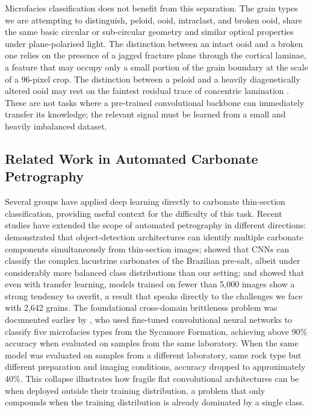 \documentclass[a4paper,fleqn]{cas-dc}
\begin{document}
Microfacies classification does not benefit from this separation. The grain types we are attempting to distinguish, peloid, ooid, intraclast, and broken ooid, share the same basic circular or sub-circular geometry and similar optical properties under plane-polarised light. The distinction between an intact ooid and a broken one relies on the presence of a jagged fracture plane through the cortical laminae, a feature that may occupy only a small portion of the grain boundary at the scale of a 96-pixel crop. The distinction between a peloid and a heavily diagenetically altered ooid may rest on the faintest residual trace of concentric lamination \citep{flugel2010}. These are not tasks where a pre-trained convolutional backbone can immediately transfer its knowledge; the relevant signal must be learned from a small and heavily imbalanced dataset.

\subsection{Related Work in Automated Carbonate Petrography}
\label{sec:lit_taxonnet}
Several groups have applied deep learning directly to carbonate thin-section classification, providing useful context for the difficulty of this task. Recent studies have extended the scope of automated petrography in different directions: \citet{dong2025carbonate} demonstrated that object-detection architectures can identify multiple carbonate components simultaneously from thin-section images; \citet{basso2025presalt} showed that CNNs can classify the complex lacustrine carbonates of the Brazilian pre-salt, albeit under considerably more balanced class distributions than our setting; and \citet{dawson2023dataset} showed that even with transfer learning, models trained on fewer than 5,000 images show a strong tendency to overfit, a result that speaks directly to the challenges we face with 2,642 grains. The foundational cross-domain brittleness problem was documented earlier by \citet{pireslima2020}, who used fine-tuned convolutional neural networks to classify five microfacies types from the Sycamore Formation, achieving above 90\% accuracy when evaluated on samples from the same laboratory. When the same model was evaluated on samples from a different laboratory, same rock type but different preparation and imaging conditions, accuracy dropped to approximately 40\%. This collapse illustrates how fragile flat convolutional architectures can be when deployed outside their training distribution, a problem that only compounds when the training distribution is already dominated by a single class.
\end{document}
